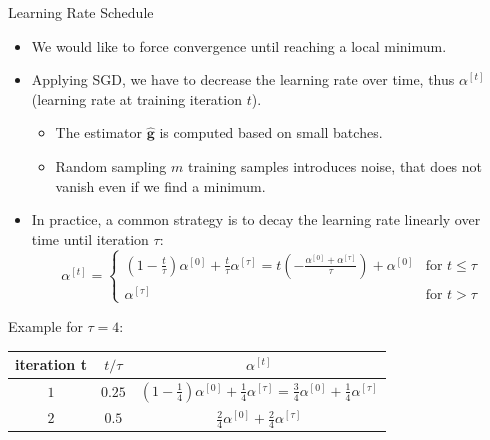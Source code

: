 \documentclass[11pt,compress,t,notes=noshow, xcolor=table]{beamer}
\begin{document}
\begin{vbframe}{Learning Rate Schedule}
  \begin{itemize}
    \item We would like to force convergence until reaching a local minimum.
    \item Applying SGD, we have to decrease the learning rate over time, thus $\alpha^{[t]}$ (learning rate at training iteration $t$).
      \begin{itemize}
        \item The estimator $\hat{\mathbf{g}}$ is computed based on small batches.
        \item Random sampling $m$ training samples introduces noise, that does not vanish even if we find a minimum.
      \end{itemize}
    \item In practice, a common strategy is to decay the learning rate linearly over time until iteration $\tau$:
         \begin{equation*}
         \alpha^{[t]} = \begin{cases}
         \left( 1 - \frac{t}{\tau} \right)\alpha^{[0]} + \frac{t}{\tau}\alpha^{[\tau]}
                    = t\left(-\frac{\alpha^{[0]} +  \alpha^{[\tau]}}{\tau}\right) + \alpha^{[0]} & 
                    \text{for $t\le\tau$} \\
                    \alpha^{[\tau]} & \text{for $t>\tau$} \end{cases}
         \end{equation*}
  \end{itemize}
  
\framebreak


\scriptsize Example for $\tau = 4$:
\begin{minipage}{\linewidth}
\centering
  \begin{center}
        {\footnotesize
        \begin{tabular}{l | c | c}
        iteration t &  $t/\tau$ & $\alpha^{[t]}$ \\ \hline
        \multicolumn{1}{c|}{$1$}       
        & $0.25$  
        & $\left(1-\frac{1}{4}\right)\alpha^{[0]} + \frac{1}{4}\alpha^{[\tau]} = \frac{3}{4}\alpha^{[0]} + \frac{1}{4}\alpha^{[\tau]}$\\
        
        \multicolumn{1}{c|}{$2$}       
        & $0.5$   
        & $\frac{2}{4}\alpha^{[0]} + \frac{2}{4}\alpha^{[\tau]}$ \\
        

\end{tabular}}
\end{center}
\end{minipage}
\end{vbframe}
\end{document}
